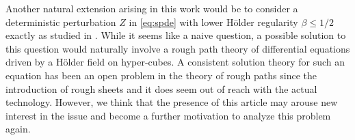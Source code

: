 \documentclass[12pt]{article}
\numberwithin{equation}{section}
\theoremstyle{plain}
\theoremstyle{definition}
\begin{document}
Another natural extension arising in this work would be to consider a deterministic perturbation $Z$ in  \eqref{eq:spde} with lower H\"older regularity $\beta\leq 1/2$ exactly as studied in \cite{Friz_Le_Hocquet21}. While it seems like a naive question, a possible solution to this question would naturally involve a rough path theory of differential equations driven by a H\"older field on hyper-cubes. A consistent solution theory for such an equation has been an open problem in the theory of rough paths since the introduction of rough sheets \cite{chouk2014roughsheets,tindel15} and it does seem out of reach with the actual technology. However, we think that the presence of this article may arouse new interest in the issue and become a further motivation to analyze this problem again.
\end{document}
